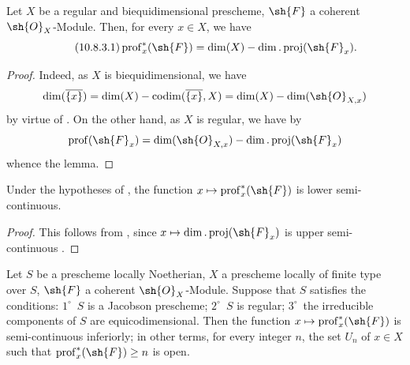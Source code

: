 \begin{lemma}[10.8.3]
\label{IV.10.8.3}
Let $X$ be a regular and biequidimensional prescheme, $\sh{F}$ a coherent $\sh{O}_X$-Module.
Then, for every $x\in X$, we have
\begin{equation}
\label{IV.10.8.3.1}
\tag{10.8.3.1}
\operatorname{prof}^*_x(\sh{F})=\dim(X)-\dim.\operatorname{proj}(\sh{F}_x).
\end{equation}
\end{lemma}

\begin{proof}
Indeed, as $X$ is biequidimensional, we have 
\[
  \dim(\overline{\{x\}})=\dim(X)-\operatorname{codim}(\overline{\{x\}},X)=\dim(X)-\dim(\sh{O}_{X,x})
\]
by virtue of .
On the other hand, as $X$ is regular, we have by 
\[
  \operatorname{prof}(\sh{F}_x)=\dim(\sh{O}_{X,x})-\dim.\operatorname{proj}(\sh{F}_x)
\]
whence the lemma.
\end{proof}

\begin{corollary}[10.8.4]
\label{IV.10.8.4}
Under the hypotheses of , the function $x\mapsto\operatorname{prof}^*_x(\sh{F})$ is lower semi-continuous.
\end{corollary}

\begin{proof}
This follows from , since $x\mapsto\dim.\operatorname{proj}(\sh{F}_x)$ is upper semi-continuous .
\end{proof}

\begin{proposition}[10.8.5]
\label{IV.10.8.5}
Let $S$ be a prescheme locally Noetherian, $X$ a prescheme locally of finite type over $S$, $\sh{F}$ a coherent $\sh{O}_X$-Module.
Suppose that $S$ satisfies the conditions: $1^\circ$~$S$ is a Jacobson prescheme; $2^\circ$~$S$ is regular; $3^\circ$~the irreducible components of $S$ are equicodimensional.
Then the function $x\mapsto\operatorname{prof}^*_x(\sh{F})$ is semi-continuous inferiorly; in other terms, for every integer $n$, the set $U_n$ of $x\in X$ such that $\operatorname{prof}^*_x(\sh{F})\geq n$ is open.
\end{proposition}

